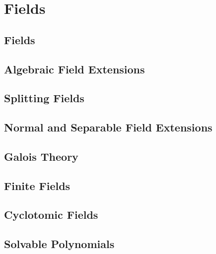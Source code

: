 
\chapter{Fields}\label{cha:fields}
\section{Fields}
\begin{defn}[Field]\label{defn:field}
\end{defn}

\section{Algebraic Field Extensions}
\section{Splitting Fields}
\section{Normal and Separable Field Extensions}
\section{Galois Theory}
\section{Finite Fields}
\section{Cyclotomic Fields}
\section{Solvable Polynomials}